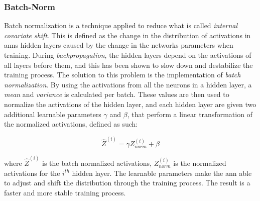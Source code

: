 \subsubsection{Batch-Norm}
    Batch normalization is a technique applied to reduce what is called \textit{internal  covariate shift}\cite{pmlr-v37-ioffe15_batch_norm}. This is defined as the change in the distribution of activations in \gls{ann}s hidden layers caused by the change in the networks parameters when training. During \textit{backpropagation}, the hidden layers depend on the activations of all layers before them, and this has been shown to slow down and destabilize the training process. The solution to this problem is the implementation of \textit{batch normalization}. By using the activations from all the neurons in a hidden layer, a \textit{mean} and \textit{variance} is calculated per batch. These values are then used to normalize the activations of the hidden layer, and each hidden layer are given two additional learnable parameters $\gamma$ and $\beta$, that perform a linear transformation of the normalized activations, defined as such:
    
        \begin{equation} \label{batch_normalization}
            \hat{Z}^{(i)} =   \gamma Z^{(i)}_{norm} + \beta
        \end{equation}
    
    where $\hat{Z}^{(i)}$ is the batch normalized activations, $Z^{(i)}_{norm}$ is the normalized activations for the $i^{th}$ hidden layer. The learnable parameters make the \gls{ann} able to adjust and shift the distribution through the training process. The result is a faster and more stable training process. 

